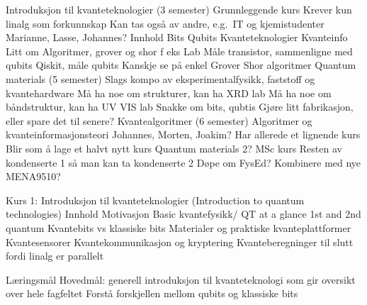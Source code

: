 \documentclass[%
oneside,                 %
final,                   %
10pt]{article}
\begin{document}
Introduksjon til kvanteteknologier (3 semester) 
Grunnleggende kurs 
Krever kun linalg som forkunnskap 
Kan tas også av andre, e.g.~IT og kjemistudenter 
Marianne, Lasse, Johannes?
Innhold 
Bits 
Qubits
Kvanteteknologier 
Kvanteinfo
Litt om Algoritmer, grover og shor f eks 
Lab 
Måle transistor, sammenligne med qubits
Qiskit, måle qubits 
Kanskje se på enkel Grover Shor algoritmer  
Quantum materials (5 semester) 
Slags kompo av eksperimentalfysikk, faststoff og kvantehardware 
Må ha noe om strukturer, kan ha XRD lab 
Må ha noe om båndstruktur, kan ha UV VIS lab  
Snakke om bits, qubtis 
Gjøre litt fabrikasjon, eller spare det til senere?
Kvantealgoritmer (6 semester) 
Algoritmer og kvanteinformasjonsteori 
Johannes, Morten, Joakim? 
Har allerede et lignende kurs 
Blir som å lage et halvt nytt kurs 
Quantum materials 2? 
MSc kurs 
Resten av kondenserte 1 så man kan ta kondenserte 2 
Døpe om FysEd? 
Kombinere med nye MENA9510? 

Kurs 1: Introduksjon til kvanteteknologier 
(Introduction to quantum technologies) 
Innhold 
Motivasjon 
Basic kvantefysikk/ QT at a glance 
1st and 2nd quantum  
Kvantebits vs klassiske bits 
Materialer og praktiske kvanteplattformer 
Kvantesensorer 
Kvantekommunikasjon og kryptering 
Kvanteberegninger til slutt fordi linalg er parallelt  

Læringsmål 
Hovedmål: generell introduksjon til kvanteteknologi som gir oversikt over hele fagfeltet 
Forstå forskjellen mellom qubits og klassiske bits 
\end{document}
